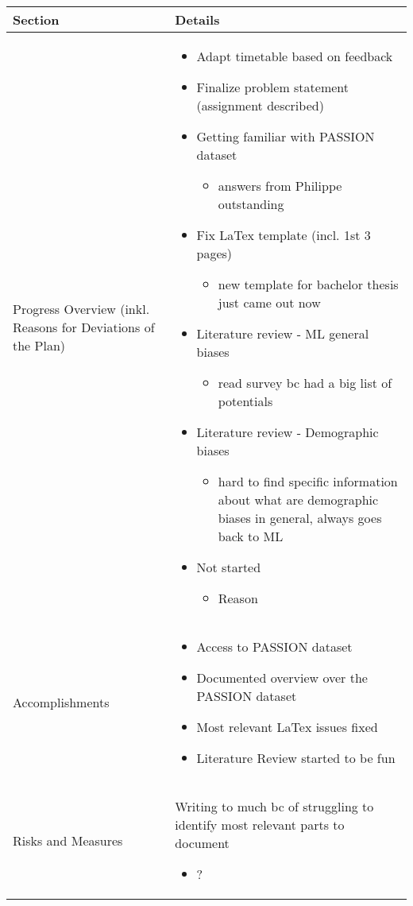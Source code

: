 \documentclass[a4paper,11pt]{article}
\newcommand{\done}{\textcolor{green}{\ding{52}}}
\newcommand{\ongoing}{\textcolor{orange}{\ding{45}}}
\newcommand{\notstarted}{\textcolor{red}{\ding{56}}}
\begin{document}
	
	\renewcommand{\arraystretch}{1.5}
	\begin{longtable}{|p{4cm}|p{10cm}|}
		\hline
		\textbf{Section} & \textbf{Details} \\
		\hline
		Progress Overview (inkl. Reasons for Deviations of the Plan) & \begin{itemize}
			\item[\done] Adapt timetable based on feedback
			\item[\ongoing] Finalize problem statement (assignment described)
			\item[\ongoing] Getting familiar with PASSION dataset
			\begin{itemize}
				\item answers from Philippe outstanding
			\end{itemize}
			\item[\ongoing] Fix LaTex template (incl. 1st 3 pages)
			\begin{itemize}
				\item new template for bachelor thesis just came out now
			\end{itemize}
			\item[\ongoing] Literature review - ML general biases
			\begin{itemize}
				\item read survey bc had a big list of potentials
			\end{itemize}
			\item[\ongoing] Literature review - Demographic biases
			\begin{itemize}
				\item hard to find specific information about what are demographic biases in general, always goes back to ML
			\end{itemize}
			
			\item[\notstarted] Not started
			\begin{itemize}
				\item Reason
			\end{itemize}
		\end{itemize} \\
		\hline
		Accomplishments & \begin{itemize}
			\item[\done] Access to PASSION dataset
			\item[\done] Documented overview over the PASSION dataset
			\item[\done] Most relevant LaTex issues fixed
			\item[\done] Literature Review started to be fun
		\end{itemize} \\
		\hline
		Risks and Measures & 
		Writing to much bc of struggling to identify most relevant parts to document
		\begin{itemize}
			\item ?
		\end{itemize}
		

\end{longtable}
\end{document}

